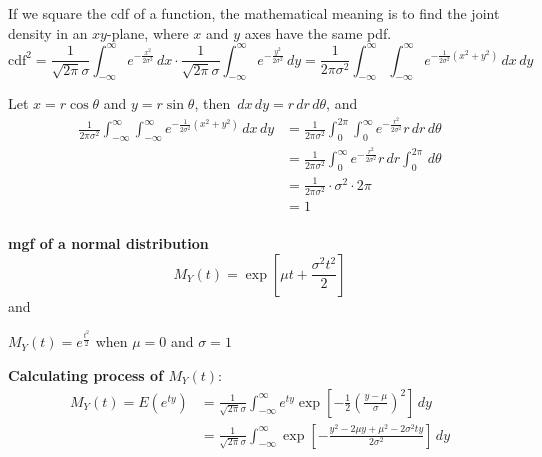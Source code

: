 \documentclass[11pt]{article}
\begin{document}
If we square the cdf of a function,  the mathematical meaning is to find the joint density in an $xy$-plane,  where $x$ and $y$ axes have the same pdf.
$$
\text {cdf} ^2 = \frac{1}{\sqrt{2\pi} \sigma} \int _{-\infty} ^\infty e^{- \frac{x^2}{2 \sigma^2}} \, dx \cdot \frac{1}{\sqrt{2\pi} \sigma} \int _{-\infty} ^\infty e^{- \frac{y^2}{2 \sigma^2}} \, dy = \frac{1}{2\pi \sigma^2} \int _{-\infty} ^\infty \int _{-\infty} ^\infty e^{- \frac{1}{2 \sigma^2} (x^2 + y^2)} \, dx \,dy
$$

Let $x=r \cos \theta$ and $y= r \sin \theta$,  then $\,dx \,dy = r \,dr \, d\theta$,  and 
$$
\begin{aligned}
\frac{1}{2\pi \sigma^2} \int _{-\infty} ^\infty \int _{-\infty} ^\infty e^{- \frac{1}{2 \sigma^2} (x^2 + y^2)} \, dx \,dy
	&= \frac{1}{2\pi \sigma^2} \int _0 ^{2\pi} \int _0 ^\infty e^{- \frac{r^2}{2 \sigma^2}} r \, dr \,d\theta \\
	&= \frac{1}{2\pi \sigma^2} \int _0 ^\infty e^{- \frac{r^2}{2 \sigma^2}} r \, dr \int _0 ^{2\pi} \,d\theta \\
	&= \frac{1}{2\pi \sigma^2} \cdot \sigma^2 \cdot 2\pi \\
	&= 1\\
\end{aligned}
$$


\begin{tcolorbox}[
	enhanced, 
	width=\textwidth, 
	fontupper=\normalsize,%
	drop fuzzy shadow southwest,
	boxrule=0.4pt,
	sharp corners,
	colframe=yellow!80!black,
	colback=yellow!10]
	
\textbf{\color{RoyalBlue} mgf of a normal distribution} 
$$
M_Y (t) = \exp \left[ \mu t + \frac{\sigma^2 t^2}{2} \right]
$$
and 
\begin{center}
$M_Y(t) = e^{\frac{t^2}{2}}$ \hspace{5pt} when $\mu = 0$ and $\sigma =1$
\end{center}


\end{tcolorbox}


\textbf{Calculating process of $M_Y(t)$}:
\[
\begin{aligned}
M_Y(t) = E(e^{ty})
	&= \frac{1}{\sqrt{2\pi} \sigma} \int _{-\infty} ^\infty e^{ty} \exp \left[ -\frac{1}{2} \left( \frac{y - \mu}{\sigma} \right) ^2 \right] \, dy \\
	&=\frac{1}{\sqrt{2\pi} \sigma} \int _{-\infty} ^\infty  \exp \left[ -\frac{y^2 - 2\mu y + \mu^2 - 2 \sigma^2 ty } {2 \sigma^2} \right] \, dy \\ \\
\end{aligned}
\]
\end{document}
